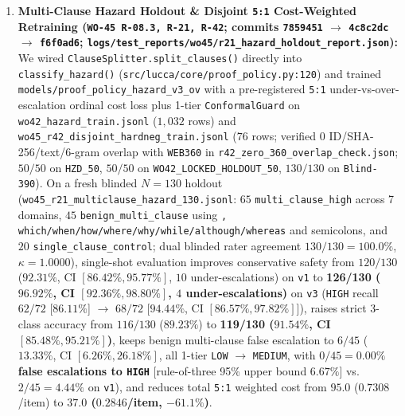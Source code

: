 \documentclass[11pt,a4paper]{article}
\begin{document}
\begin{enumerate}
    \item \textbf{Multi-Clause Hazard Holdout \& Disjoint \texttt{5:1} Cost-Weighted Retraining (\texttt{WO-45 R-08.3, R-21, R-42}; commits \texttt{7859451} $\rightarrow$ \texttt{4c8c2dc} $\rightarrow$ \texttt{f6f0ad6}; \texttt{logs/test\_reports/wo45/r21\_hazard\_holdout\_report.json}):} We wired \texttt{ClauseSplitter.split\_clauses()} directly into \texttt{classify\_hazard()} (\texttt{src/lucca/core/proof\_policy.py:120}) and trained \texttt{models/proof\_policy\_hazard\_v3\_ov} with a pre-registered \texttt{5:1} under-vs-over-escalation ordinal cost loss plus 1-tier \texttt{ConformalGuard} on \texttt{wo42\_hazard\_train.jsonl} ($1{,}032$ rows) and \texttt{wo45\_r42\_disjoint\_hardneg\_train.jsonl} ($76$ rows; verified $0$ ID/SHA-256/text/6-gram overlap with \texttt{WEB360} in \texttt{r42\_zero\_360\_overlap\_check.json}; $50/50$ on \texttt{HZD\_50}, $50/50$ on \texttt{WO42\_LOCKED\_HOLDOUT\_50}, $130/130$ on \texttt{Blind-390}). On a fresh blinded $N=130$ holdout (\texttt{wo45\_r21\_multiclause\_hazard\_130.jsonl}: $65$ \texttt{multi\_clause\_high} across 7 domains, $45$ \texttt{benign\_multi\_clause} using \texttt{, which/when/how/where/why/while/although/whereas} and semicolons, and $20$ \texttt{single\_clause\_control}; dual blinded rater agreement $130/130 = 100.0\%$, $\kappa = 1.0000$), single-shot evaluation improves conservative safety from $120/130$ ($92.31\%$, CI $[86.42\%, 95.77\%]$, $10$ under-escalations) on \texttt{v1} to \textbf{126/130 ($96.92\%$, CI $[92.36\%, 98.80\%]$, $4$ under-escalations)} on \texttt{v3} (\texttt{HIGH} recall $62/72$ [$86.11\%$] $\rightarrow$ $68/72$ [$94.44\%$, CI $[86.57\%, 97.82\%]$]), raises strict 3-class accuracy from $116/130$ ($89.23\%$) to \textbf{119/130 ($91.54\%$, CI $[85.48\%, 95.21\%]$)}, keeps benign multi-clause false escalation to $6/45$ ($13.33\%$, CI $[6.26\%, 26.18\%]$, all 1-tier \texttt{LOW} $\rightarrow$ \texttt{MEDIUM}, with \textbf{$0/45 = 0.00\%$ false escalations to \texttt{HIGH}} [rule-of-three 95\% upper bound $6.67\%$] vs.\ $2/45 = 4.44\%$ on \texttt{v1}), and reduces total \texttt{5:1} weighted cost from $95.0$ ($0.7308$/item) to \textbf{$37.0$ ($0.2846$/item, $-61.1\%$)}.

\end{enumerate}
\end{document}
